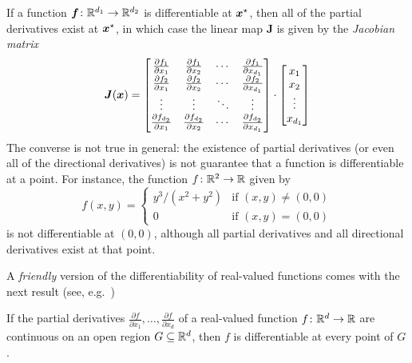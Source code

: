 \begin{remark}
If a function $\boldsymbol{f} \colon \mathbb{R}^{d_1} \to \mathbb{R}^{d_2}$ is differentiable at $\boldsymbol{x}^{\star}$, then all of the partial derivatives exist at $\boldsymbol{x}^{\star}$, in which case the linear map $\boldsymbol{J}$ is given by the \emph{Jacobian matrix}
\begin{equation*}
\boldsymbol{J}(\boldsymbol{x}) = \begin{bmatrix} 
\frac{\partial f_1}{\partial x_1} & \frac{\partial f_1}{\partial x_2} & \dotsb & \frac{\partial f_1}{\partial x_{d_1}} \\
\frac{\partial f_2}{\partial x_1} & \frac{\partial f_2}{\partial x_2} & \dotsb & \frac{\partial f_2}{\partial x_{d_1}} \\
\vdots & \vdots & \ddots & \vdots \\
\frac{\partial f_{d_2}}{\partial x_1} & \frac{\partial f_{d_2}}{\partial x_2} & \dotsb & \frac{\partial f_{d_2}}{\partial x_{d_1}} \\
\end{bmatrix} \cdot \begin{bmatrix}
x_1 \\ x_2 \\ \vdots \\ x_{d_1} 
\end{bmatrix}
\end{equation*}
The converse is not true in general: the existence of partial derivatives (or even all of the directional derivatives) is not guarantee that a function is differentiable at a point.  For instance, the function $f \colon \mathbb{R}^2 \to \mathbb{R}$ given by
\begin{equation*}
f(x,y) = \begin{cases} 
y^3/(x^2+y^2) &\text{if }(x,y) \neq (0,0) \\
0 &\text{if }(x,y) = (0,0) \end{cases}
\end{equation*}
is not differentiable at $(0,0)$, although all partial derivatives and all directional derivatives exist at that point.
\end{remark}


\separator 

A \emph{friendly} version of the differentiability of real-valued functions comes with the next result (see, e.g.~\cite[p.818]{finney2001thomas})
\begin{theorem}\label{theorem:partialgivesDerivative}
If the partial derivatives $\frac{\partial f}{\partial x_1}, \dotsc, \frac{\partial f}{\partial x_d}$ of a real-valued function $f \colon \mathbb{R}^d \to \mathbb{R}$ are continuous on an open region $G \subseteq \mathbb{R}^d$, then $f$ is differentiable at every point of $G$.
\end{theorem}

